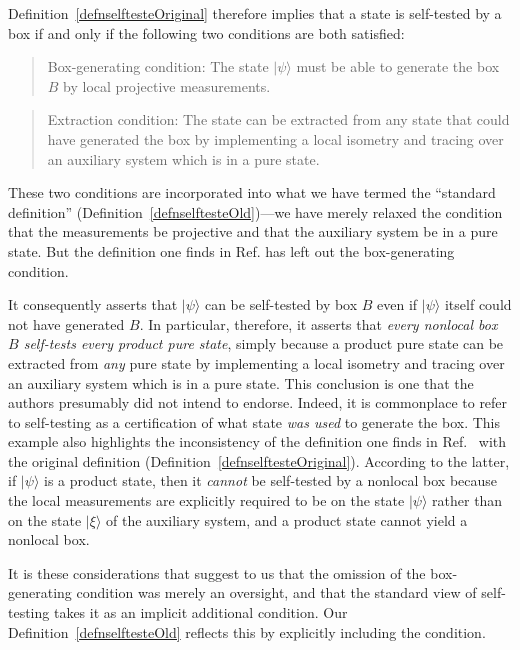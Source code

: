 \documentclass[prx,11pt,letterpaper,twocolumn,accepted=2023-11-27]{quantumarticle}
\newcommand{\rob}{\color{black}}
\newcommand{\blk}{\color{black}}
\theoremstyle{plain}
\theoremstyle{definition}
\begin{document}
\begin{appendices}
 
  Definition~\ref{defnselftesteOriginal} therefore
  implies that a state is self-tested by a box if and only if the following two conditions are both satisfied:
\begin{quote} Box-generating condition: The state $|\psi\rangle$ must be able to generate the box $B$ by local projective measurements.
\end{quote}
\begin{quote} Extraction condition: The state can be extracted from any state that could have generated the box by implementing a local isometry and tracing over an auxiliary system which is in a pure state.
\end{quote}
These two conditions are incorporated into what we have termed the ``standard definition'' (Definition~\ref{defnselftesteOld})---we have merely relaxed the condition that the measurements be projective and that the auxiliary system be in a pure state.  But the definition one finds in Ref.\cite{vsupic2020self}
 has left out the box-generating condition.

 It consequently 
asserts that  $|\psi\rangle$ can be self-tested by box $B$ even if $|\psi\rangle$ itself could not have generated $B$.  In particular, therefore, it asserts that {\em every nonlocal box $B$ self-tests every 
product pure state}, simply because a product
 pure state can be extracted from {\em any} pure state by 
\rob implementing a local isometry and tracing over an auxiliary system which is in a pure state\blk.
 This conclusion is one that the authors presumably did not intend to endorse.  Indeed, it is commonplace to refer to self-testing as a certification of what state {\em was used} to generate the box.  This example also highlights the inconsistency of the definition one finds in Ref.~\cite{vsupic2020self} with the original definition (Definition~\ref{defnselftesteOriginal}).  According to the latter, if $|\psi\rangle$ is a product state, then it {\em cannot}  be self-tested by a nonlocal box because  the local measurements are explicitly required to be on the state $|\psi\rangle$ rather than on the state $|\xi\rangle$ of the auxiliary system, and a product state cannot yield a nonlocal box. 

It is these considerations that suggest to us that the omission of the box-generating condition was merely an oversight, and that the standard view of self-testing takes it as an implicit additional condition. Our Definition~\ref{defnselftesteOld} reflects this by explicitly including the condition.


\end{appendices}
\end{document}
